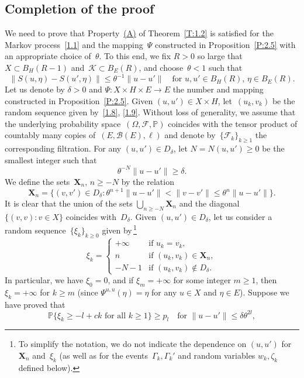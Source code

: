 \documentclass[JEP,XML,SOM,Unicode,ThmDefs]{cedram}
\let\mathcal\mathscr
\theoremstyle{plain}
\numberwithin{equation}{section}
\newcommand{\IP}{{\mathbb P}}
\newcommand{\XXX}{{\boldsymbol{X}}}
\newcommand{\BB}{{\mathcal B}}
\newcommand{\FF}{{\mathcal F}}
\newcommand{\KK}{{\mathcal K}}
\begin{document}
\subsection{Completion of the proof}
\label{s3.4}
We need to prove that Property~\hyperlink{(A)}{(A)} of Theorem~\ref{T:1.2} is satisfied for the Markov process~\eqref{1.1} and the mapping~$\varPsi$ constructed in Proposition~\ref{P:2.5} with an appropriate choice of~$\theta$. To this end, we fix $R>0$ so large that $X\subset B_H(R-1)$ and~$\KK\subset B_E(R)$, and choose~$\theta<1$ such that
\begin{equation} \label{3.26}
\|S(u,\eta)-S(u',\eta)\|\le \theta^{-1}\|u-u'\|\quad
\text{for $u,u'\in B_H(R)$, $\eta\in B_E(R)$}.
\end{equation}
Let us denote by $\delta>0$ and $\varPsi:X\times H\times E\to E$ the number and mapping constructed in Proposition~\ref{P:2.5}. Given $(u,u')\in X\times H$, let~$(u_k,v_k)$ be the random sequence given by~\eqref{1.8}, \eqref{1.9}. Without loss of generality, we assume that the underlying probability space~$(\Omega,\FF,\IP)$ coincides with the tensor product of countably many copies of~$(E,\BB(E),\ell)$ and denote by~$\{\FF_k\}_{k\ge1}$ the corresponding filtration. For any $(u,u')\in D_\delta$, let $N=N(u,u')\ge0$ be the smallest integer such that
\[
\theta^{-N}\|u-u'\|\ge\delta.
\]
We define the sets~$\XXX_n$, $n\ge -N$ by the relation
\begin{equation} \label{3.27}
\XXX_n=\{(v,v')\in D_\delta:\theta^{n+1}\|u-u'\|<\|v-v'\|\le\theta^{n}\|u-u'\|\}.
\end{equation}
It is clear that the union of the sets $\bigcup_{n\ge -N}\XXX_n$ and the diagonal $\{(v,v):v\in X\}$ coincides with~$D_\delta$. Given $(u,u')\in D_\delta$, let us consider a random sequence~$\{\xi_k\}_{k\ge0}$ given by\,\footnote{To simplify the notation, we do not indicate the dependence on $(u,u')$ for~$\XXX_n$ and~$\xi_k$ (as well as for the events~$\Gamma_k,\Gamma_k'$ and random variables $w_k, \zeta_k$ defined below). }
\[
\xi_k=
\begin{cases}
+\infty&\text{if $u_k=v_k$},\\
n&\text{if $(u_k,v_k)\in\XXX_n$}, \\
-N-1 & \text{if $(u_k,v_k)\notin D_\delta$}.
\end{cases}
\]
In particular, we have $\xi_0=0$, and if $\xi_m=+\infty$ for some integer $m\ge1$, then $\xi_k=+\infty$ for $k\ge m$ (since $\varPsi^{u,u}(\eta)=\eta$ for any $u\in X$ and $\eta\in E$). Suppose we have proved that
\begin{equation} \label{3.28}
\IP\{\xi_k\ge -l+ck\text{ for all $k\ge1$}\}\ge p_l
\quad\text{for $\|u-u'\|\le \delta\theta^{2l}$},
\end{equation}
\end{document}
